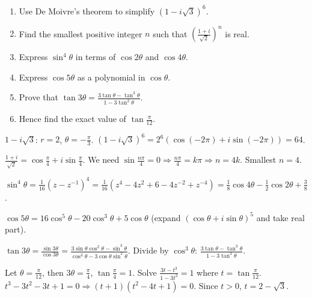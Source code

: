 \documentclass[11pt]{article}
\begin{document}
\begin{exercice}
\begin{enumerate}
\item Use De Moivre's theorem to simplify $(1-i\sqrt{3})^6$.
\item Find the smallest positive integer $n$ such that $\left(\frac{1+i}{\sqrt{2}}\right)^n$ is real.
\item Express $\sin^4\theta$ in terms of $\cos2\theta$ and $\cos4\theta$.
\item Express $\cos5\theta$ as a polynomial in $\cos\theta$.
\item Prove that $\tan3\theta = \frac{3\tan\theta - \tan^3\theta}{1-3\tan^2\theta}$.
\item Hence find the exact value of $\tan\frac{\pi}{12}$.
\end{enumerate}
\end{exercice}

\begin{corrige}[Exercise 1]
$1-i\sqrt{3}$: $r=2$, $\theta=-\frac{\pi}{3}$. $(1-i\sqrt{3})^6 = 2^6(\cos(-2\pi)+i\sin(-2\pi)) = 64$.
\end{corrige}
\begin{corrige}[Exercise 2]
$\frac{1+i}{\sqrt{2}} = \cos\frac{\pi}{4}+i\sin\frac{\pi}{4}$. We need $\sin\frac{n\pi}{4}=0 \Rightarrow \frac{n\pi}{4}=k\pi \Rightarrow n=4k$. Smallest $n=4$.
\end{corrige}
\begin{corrige}[Exercise 3]
$\sin^4\theta = \frac{1}{16}(z-z^{-1})^4 = \frac{1}{16}(z^4 - 4z^2 + 6 - 4z^{-2} + z^{-4}) = \frac{1}{8}\cos4\theta - \frac{1}{2}\cos2\theta + \frac{3}{8}$.
\end{corrige}
\begin{corrige}[Exercise 4]
$\cos5\theta = 16\cos^5\theta - 20\cos^3\theta + 5\cos\theta$ (expand $(\cos\theta+i\sin\theta)^5$ and take real part).
\end{corrige}
\begin{corrige}[Exercise 5]
$\tan3\theta = \frac{\sin3\theta}{\cos3\theta} = \frac{3\sin\theta\cos^2\theta-\sin^3\theta}{\cos^3\theta-3\cos\theta\sin^2\theta}$. Divide by $\cos^3\theta$: $\frac{3\tan\theta-\tan^3\theta}{1-3\tan^2\theta}$.
\end{corrige}
\begin{corrige}[Exercise 6]
Let $\theta=\frac{\pi}{12}$, then $3\theta=\frac{\pi}{4}$, $\tan\frac{\pi}{4}=1$. Solve $\frac{3t-t^3}{1-3t^2}=1$ where $t=\tan\frac{\pi}{12}$. $t^3-3t^2-3t+1=0 \Rightarrow (t+1)(t^2-4t+1)=0$. Since $t>0$, $t=2-\sqrt{3}$.
\end{corrige}
\end{document}
